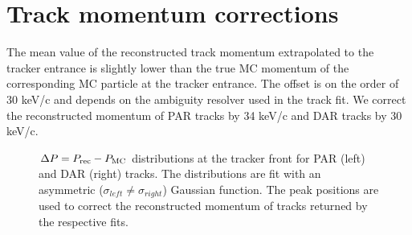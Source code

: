 \section{Track momentum corrections}

The mean value of the reconstructed track momentum extrapolated to the tracker entrance is
slightly lower than the true MC momentum of the corresponding MC particle at the tracker entrance.
The offset is on the order of 30 keV/c and depends on the ambiguity resolver used in the track fit.
We correct the reconstructed momentum of PAR tracks by 34 keV/c and DAR tracks by 30 keV/c.

\begin{figure}[h]
\hspace{-0.6in}

\caption{
  \label{fig:sindrum_ii_fig_08_fit} 
  $\Delta P = P_{\rm rec} - P_{\rm MC}$ distributions at the tracker front for PAR (left) and DAR (right) tracks.
  The distributions are fit with an asymmetric ($\sigma_{left} \ne \sigma_{right}$) Gaussian function. 
  The peak positions are used to correct the reconstructed momentum of tracks returned by the respective fits.
}
\end{figure}


